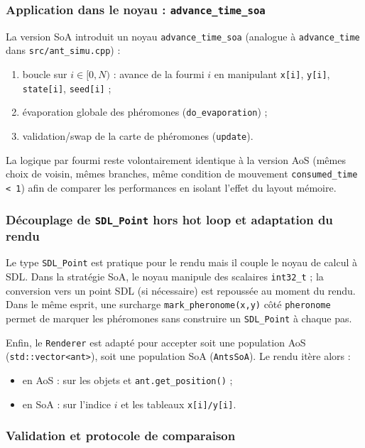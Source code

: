 \subsubsection{Application dans le noyau : \texttt{advance\_time\_soa}}

La version SoA introduit un noyau \texttt{advance\_time\_soa} (analogue à \texttt{advance\_time} dans
\texttt{src/ant\_simu.cpp}) :
\begin{enumerate}[leftmargin=*]
    \item boucle sur $i \in [0, N)$ : avance de la fourmi $i$ en manipulant \texttt{x[i]}, \texttt{y[i]},
    \texttt{state[i]}, \texttt{seed[i]} ;
    \item évaporation globale des phéromones (\texttt{do\_evaporation}) ;
    \item validation/swap de la carte de phéromones (\texttt{update}).
\end{enumerate}
La logique par fourmi reste volontairement identique à la version AoS (mêmes choix de voisin, mêmes branches,
même condition de mouvement \texttt{consumed\_time < 1}) afin de comparer les performances en isolant l'effet du
layout mémoire.

\subsubsection{Découplage de \texttt{SDL\_Point} hors hot loop et adaptation du rendu}

Le type \texttt{SDL\_Point} est pratique pour le rendu mais il couple le noyau de calcul à SDL. Dans la stratégie
SoA, le noyau manipule des scalaires \texttt{int32\_t} ; la conversion vers un point SDL (si nécessaire) est
repoussée au moment du rendu. Dans le même esprit, une surcharge \texttt{mark\_pheronome(x,y)} côté
\texttt{pheronome} permet de marquer les phéromones sans construire un \texttt{SDL\_Point} à chaque pas.

Enfin, le \texttt{Renderer} est adapté pour accepter soit une population AoS (\texttt{std::vector<ant>}), soit une
population SoA (\texttt{AntsSoA}). Le rendu itère alors :
\begin{itemize}[leftmargin=*]
    \item en AoS : sur les objets et \texttt{ant.get\_position()} ;
    \item en SoA : sur l'indice $i$ et les tableaux \texttt{x[i]/y[i]}.
\end{itemize}

\subsubsection{Validation et protocole de comparaison}

